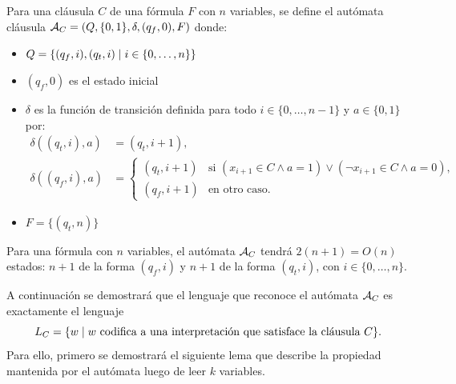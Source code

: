 \begin{definition}
    Para una cláusula $C$ de una fórmula $F$ con $n$ variables, se define el autómata cláusula $\mathcal{A}_C = (Q, \{0, 1\}, \delta, (q_f, 0), F)$ donde:
    \begin{itemize}
        \item $Q = \{(q_f, i), (q_t, i) \;|\; i \in \{0, \ldots, n\}\}$
        \item $(q_f, 0)$ es el estado inicial
        \item $\delta$ es la función de transición definida para todo $i \in \{0, \ldots, n-1\}$ y $a \in \{0, 1\}$ por:
              $$
                  \begin{aligned}
                      \delta((q_t, i), a)
                       & = (q_t, i+1), \\
                      \delta((q_f, i), a)
                       & =
                      \begin{cases}
                          (q_t, i+1)
                           & \text{si } (x_{i+1} \in C \land a = 1)
                          \lor (\neg x_{i+1} \in C \land a = 0),    \\
                          (q_f, i+1)
                           & \text{en otro caso}.
                      \end{cases}
                  \end{aligned}
              $$
        \item $F = \{(q_t, n)\}$
    \end{itemize}

\end{definition}

Para una fórmula con $n$ variables, el autómata $\mathcal{A}_C$ tendrá $2(n + 1) = O(n)$ estados: $n+1$ de la forma $(q_f, i)$ y $n+1$ de la forma $(q_t, i)$, con $i \in \{0, \ldots, n\}$.

A continuación se demostrará que el lenguaje que reconoce el autómata $\mathcal{A}_{C}$ es exactamente el lenguaje
$$
    L_{C} = \{ w \;|\; w \text{ codifica a una interpretación que satisface la cláusula } C \}.
$$
Para ello, primero se demostrará el siguiente lema que describe la propiedad mantenida por el autómata luego de leer $k$ variables.

